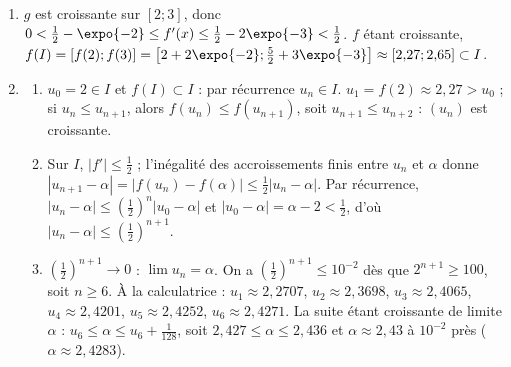\begin{corrige}
\begin{sol}
\begin{description}
\begin{enumerate}
            $\alpha \in I$. De plus $\theta(2{,}4) = -0{,}2 + 2{,}4\expo{-2{,}4} \approx 0{,}018 > 0$ et
            $\theta(2{,}5) = -0{,}25 + 2{,}5\expo{-2{,}5} \approx -0{,}045 < 0$, donc $2{,}4 < \alpha < 2{,}5$.
      \item $g$ est croissante sur $[2 ; 3]$, donc $0 < \frac{1}{2} - \expo{-2} \leq f'(x) \leq \frac{1}{2} - 2\expo{-3} < \frac{1}{2}$.
            $f$ \'etant croissante, $f(I) = [f(2) ; f(3)] = \left[ 2 + 2\expo{-2} ; \frac{5}{2} + 3\expo{-3} \right] \approx [2{,}27 ; 2{,}65] \subset I$.
      \item \begin{enumerate}
            \item $u_0 = 2 \in I$ et $f(I) \subset I$ : par r\'ecurrence $u_n \in I$.
                  $u_1 = f(2) \approx 2{,}27 > u_0$ ; si $u_n \leq u_{n+1}$, alors $f(u_n) \leq f(u_{n+1})$, soit $u_{n+1} \leq u_{n+2}$ :
                  $(u_n)$ est croissante.
            \item Sur $I$, $|f'| \leq \frac{1}{2}$ ; l'in\'egalit\'e des accroissements finis entre $u_n$ et $\alpha$ donne
                  $|u_{n+1} - \alpha| = |f(u_n) - f(\alpha)| \leq \frac{1}{2}|u_n - \alpha|$. Par r\'ecurrence,
                  $|u_n - \alpha| \leq \left( \frac{1}{2} \right)^n |u_0 - \alpha|$ et $|u_0 - \alpha| = \alpha - 2 < \frac{1}{2}$, d'o\`u
                  $|u_n - \alpha| \leq \left( \frac{1}{2} \right)^{n+1}$.
            \item $\left( \frac{1}{2} \right)^{n+1} \to 0$ : $\boxed{\lim u_n = \alpha}$. On a $\left( \frac{1}{2} \right)^{n+1} \leq 10^{-2}$ d\`es
                  que $2^{n+1} \geq 100$, soit $n \geq 6$. \`A la calculatrice : $u_1 \approx 2{,}2707$, $u_2 \approx 2{,}3698$,
                  $u_3 \approx 2{,}4065$, $u_4 \approx 2{,}4201$, $u_5 \approx 2{,}4252$, $u_6 \approx 2{,}4271$.
                  La suite \'etant croissante de limite $\alpha$ : $u_6 \leq \alpha \leq u_6 + \frac{1}{128}$, soit
                  $2{,}427 \leq \alpha \leq 2{,}436$ et $\boxed{\alpha \approx 2{,}43}$ \`a $10^{-2}$ pr\`es ($\alpha \approx 2{,}4283$).
            \end{enumerate}
      \end{enumerate}
\end{description}
\end{sol}


\end{corrige}
